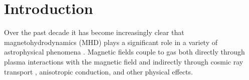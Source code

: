 \section{Introduction}
\label{sec:intro}


Over the past decade it has become increasingly clear that magnetohydrodynamics (MHD) plays a significant role in a variety of astrophysical phenomena \citep{naab_2017, tumlinson_2017, han_2017}. Magnetic fields couple to gas both directly through plasma interactions with the magnetic field and indirectly through cosmic ray transport \citep{werhahn_gamma-ray_2023, yoshida_trajectory_2021}, anisotropic conduction\citep{bruggen_2023}, and other physical effects.



